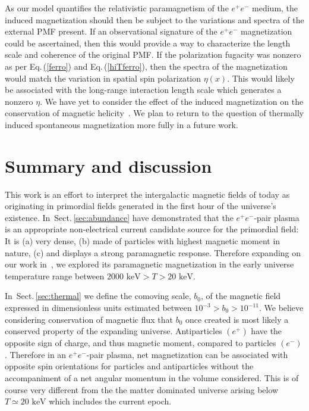 \documentclass[aps,prd,floatfix,reprint]{revtex4-2}
\newcommand*{\keV}{\text{ keV}}
\newcommand{\req}[1]{Eq.\,(\ref{#1})}
\newcommand{\rsec}[1]{Sect.\,{\ref{#1}}}
\begin{document}
{As our model quantifies the relativistic paramagnetism of the $e^{+}e^{-}$ medium, the induced magnetization should then be subject to the variations and spectra of the external PMF present. If an observational signature of the $e^{+}e^{-}$ magnetization could be ascertained, then this would provide a way to characterize the length scale and coherence of the original PMF. If the polarization fugacity was nonzero as per \req{ferro} and \req{hiTferro}, then the spectra of the magnetization would match the variation in spatial spin polarization $\eta(x)$. This would likely be associated with the long-range interaction length scale which generates a nonzero $\eta$. We have yet to consider the effect of the induced magnetization on the conservation of magnetic helicity~\cite{Boyarsky:2011uy}. We plan to return to the question of thermally induced spontaneous magnetization more fully in a future work.
}

\section{Summary and discussion}
\label{sec:conclusions}
\noindent This work is an effort to interpret the intergalactic magnetic fields of today as originating in primordial fields generated in the first hour of the universe's existence. In~\rsec{sec:abundance} have demonstrated that the $e^{+}e^{-}$-pair plasma is an appropriate non-electrical current candidate source for the primordial field: It is (a) very dense, (b) made of particles with highest magnetic moment in nature, (c) and displays a strong paramagnetic response. Therefore expanding on our work in~\cite{Rafelski:2023emw}, we explored its paramagnetic magnetization in the early universe temperature range between $2000\keV>T>20\keV$. 

In~\rsec{sec:thermal} we define the comoving scale, $b_{0}$, of the magnetic field expressed in dimensionless units estimated between $10^{-3}>b_{0}>10^{-11}$. We believe considering conservation of magnetic flux that $b_{0}$ once created is most likely a conserved property of the expanding universe. Antiparticles $(e^{+})$ have the opposite sign of charge, and thus magnetic moment, compared to particles $(e^{-})$. Therefore in an $e^{+}e^{-}$-pair plasma, net magnetization can be associated with opposite spin orientations for particles and antiparticles without the accompaniment of a net angular momentum in the volume considered. This is of course very different from the the matter dominated universe arising below $T\simeq 20\keV$ which includes the current epoch.
\end{document}

